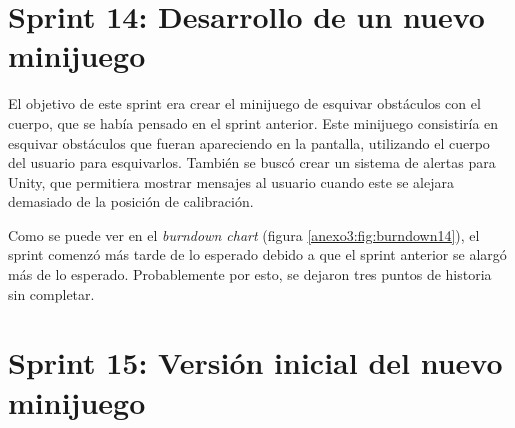 

\section{Sprint 14: Desarrollo de un nuevo minijuego}
\label{anexo3:sec:sprint14}

El objetivo de este sprint era crear el minijuego de esquivar obstáculos con el cuerpo, que se
había pensado en el sprint anterior. Este minijuego consistiría en esquivar obstáculos que
fueran apareciendo en la pantalla, utilizando el cuerpo del usuario para esquivarlos. También
se buscó crear un sistema de alertas para Unity, que permitiera mostrar mensajes al usuario
cuando este se alejara demasiado de la posición de calibración.

Como se puede ver en el \textit{burndown chart} (figura \ref{anexo3:fig:burndown14}), el sprint
comenzó más tarde de lo esperado debido a que el sprint anterior se alargó más de lo esperado.
Probablemente por esto, se dejaron tres puntos de historia sin completar.




\section{Sprint 15: Versión inicial del nuevo minijuego}
\label{anexo3:sec:sprint15}

